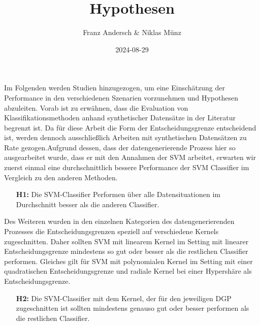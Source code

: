 \documentclass[
]{article}
\title{Hypothesen}
\author{Franz Andersch \& Niklas Münz}
\date{2024-08-29}
\renewcommand{\maketitle}{}
\begin{document}
\maketitle

Im Folgenden werden Studien hinzugezogen, um eine Einschätzung der
Performance in den verschiedenen Szenarien vorzunehmen und Hypothesen
abzuleiten. Vorab ist zu erwähnen, dass die Evaluation von
Klassifikationsmethoden anhand synthetischer Datensätze in der Literatur
begrenzt ist. Da für diese Arbeit die Form der Entscheidungsgrenze
entscheidend ist, werden dennoch ausschließlich Arbeiten mit
synthetischen Datensätzen zu Rate gezogen.\newline Aufgrund dessen, dass
der datengenerierende Prozess hier so ausgearbeitet wurde, dass er mit
den Annahmen der SVM arbeitet, erwarten wir zuerst einmal eine
durchschnittlich bessere Performance der SVM Classifier im Vergleich zu
den anderen Methoden.

\begin{minipage}{0.9\linewidth}
\begin{itemize}[leftmargin=0.1\linewidth]
\item[\textbf{H1:}] Die SVM-Classifier Performen über alle Datensituationen im Durchschnitt besser als die anderen Classifier.
\end{itemize}
\end{minipage}

Des Weiteren wurden in den einzelnen Kategorien des datengenerierenden
Prozesses die Entscheidungsgrenzen speziell auf verschiedene Kernels
zugeschnitten. Daher sollten SVM mit linearem Kernel im Setting mit
linearer Entscheidungsgrenze mindestens so gut oder besser als die
restlichen Classifier performen. Gleiches gilt für SVM mit polynomialen
Kernel im Setting mit einer quadratischen Entscheidungsgrenze und
radiale Kernel bei einer Hypershäre als Entscheidungsgrenze.

\begin{minipage}{0.9\linewidth}
\begin{itemize}[leftmargin=0.1\linewidth]
\item[\textbf{H2:}] Die SVM-Classifier mit dem Kernel, der für den jeweiligen DGP zugeschnitten ist sollten mindestens genauso gut oder besser performen als die restlichen Classifier.
\end{itemize}
\end{minipage}
\end{document}

